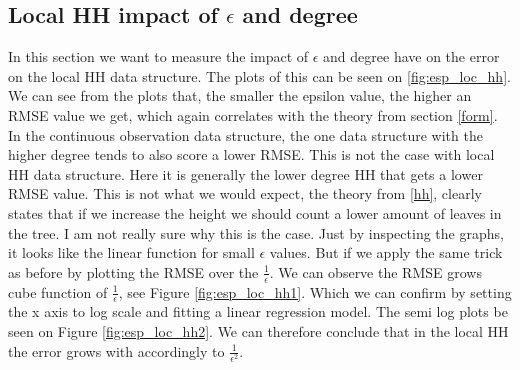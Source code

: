 \documentclass[11pt]{article}
\theoremstyle{definition}
\begin{document}
\subsection{Local HH impact of $\epsilon$ and degree}
In this section we want to measure the impact of $\epsilon$ and degree have on the error on the local HH data structure. The plots of this can be seen on \ref{fig:esp_loc_hh}. We can see from the plots that, the smaller the epsilon value, the higher an RMSE value we get, which again correlates with the theory from section \ref{form}. In the continuous observation data structure, the one data structure with the higher degree tends to also score a lower RMSE. This is not the case with local HH data structure. Here it is generally the lower degree HH that gets a lower RMSE value. This is not what we would expect, the theory from \ref{hh}, clearly states that if we increase the height we should count a lower amount of leaves in the tree. I am not really sure why this is the case. Just by inspecting the graphs, it looks like the linear function for small $\epsilon$ values. But if we apply the same trick as before by plotting the RMSE over the $\frac{1}{\epsilon}$. We can observe the RMSE grows cube function of $\frac{1}{\epsilon}$, see Figure \ref{fig:esp_loc_hh1}. Which we can confirm by setting the x axis to log scale and fitting a linear regression model. The semi log plots be seen on Figure \ref{fig:esp_loc_hh2}.  We can therefore conclude that in the local HH the error grows with accordingly to $\frac{1}{\epsilon^2}$.
\end{document}
